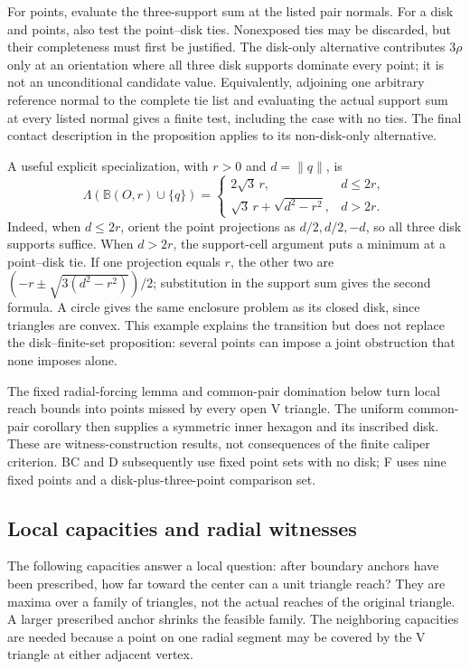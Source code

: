 For points, evaluate the three-support sum at the listed pair normals.
For a disk and points, also test the point--disk ties. Nonexposed ties
may be discarded, but their completeness must first be justified.
The disk-only alternative contributes $3\rho$ only at an orientation
where all three disk supports dominate every point; it is not an
unconditional candidate value. Equivalently, adjoining one arbitrary
reference normal to the complete tie list and evaluating the actual
support sum at every listed normal gives a finite test, including the
case with no ties. The final contact description in the proposition
applies to its non-disk-only alternative.

A useful explicit specialization, with $r>0$ and $d=\|q\|$, is
\[
\Lambda(\mathbb B(O,r)\cup\{q\})=
\begin{cases}
2\sqrt3\,r,&d\le2r,\\
\sqrt3\,r+\sqrt{d^2-r^2},&d>2r.
\end{cases}
\]
Indeed, when $d\le2r$, orient the point projections as
$d/2,d/2,-d$, so all three disk supports suffice. When $d>2r$,
the support-cell argument puts a minimum at a point--disk tie.
If one projection equals $r$, the other two are
$(-r\pm\sqrt{3(d^2-r^2)})/2$; substitution in the support sum
gives the second formula. A circle gives the same enclosure problem
as its closed disk, since triangles are convex.
This example explains the transition but does not replace the
disk--finite-set proposition: several points can impose a joint
obstruction that none imposes alone.

The fixed radial-forcing lemma and common-pair domination below
turn local reach bounds into points missed by every open V triangle.
The uniform common-pair corollary then supplies a symmetric inner
hexagon and its inscribed disk. These are witness-construction results,
not consequences of the finite caliper criterion. BC and D subsequently
use fixed point sets with no disk; F uses nine fixed points and a
disk-plus-three-point comparison set.

\subsection{Local capacities and radial witnesses}

The following capacities answer a local question: after boundary anchors
have been prescribed, how far toward the center can a unit triangle reach?
They are maxima over a family of triangles, not the actual reaches of the
original triangle. A larger prescribed anchor shrinks the feasible family.
The neighboring capacities are needed because a point on one radial segment
may be covered by the V triangle at either adjacent vertex.

